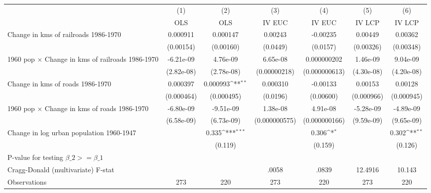 {
\def\sym#1{\ifmmode^{#1}\else\(^{#1}\)\fi}
\begin{tabular}{l*{6}{c}}
\hline\hline
                &\multicolumn{1}{c}{(1)}&\multicolumn{1}{c}{(2)}&\multicolumn{1}{c}{(3)}&\multicolumn{1}{c}{(4)}&\multicolumn{1}{c}{(5)}&\multicolumn{1}{c}{(6)}\\
                &\multicolumn{1}{c}{OLS}&\multicolumn{1}{c}{OLS}&\multicolumn{1}{c}{IV EUC}&\multicolumn{1}{c}{IV EUC}&\multicolumn{1}{c}{IV LCP}&\multicolumn{1}{c}{IV LCP}\\
\hline
Change in kms of railroads 1986-1970& 0.000911         & 0.000147         &  0.00243         & -0.00235         &  0.00449         &  0.00362         \\
                &(0.00154)         &(0.00160)         & (0.0449)         & (0.0157)         &(0.00326)         &(0.00348)         \\
[1em]
1960 pop $\times$ Change in kms of railroads 1986-1970&-6.21e-09         & 4.76e-09         & 6.65e-08         &0.000000202         & 1.46e-09         & 9.04e-09         \\
                &(2.82e-08)         &(2.78e-08)         &(0.00000218)         &(0.000000613)         &(4.30e-08)         &(4.20e-08)         \\
[1em]
Change in kms of roads 1986-1970& 0.000397         & 0.000993\sym{**} & 0.000310         & -0.00133         &  0.00153         &  0.00128         \\
                &(0.000464)         &(0.000495)         & (0.0196)         &(0.00600)         &(0.000966)         &(0.000945)         \\
[1em]
1960 pop $\times$ Change in kms of roads 1986-1970&-6.80e-09         &-9.51e-09         & 1.38e-08         & 4.91e-08         &-5.28e-09         &-4.89e-09         \\
                &(6.58e-09)         &(6.73e-09)         &(0.000000575)         &(0.000000166)         &(9.59e-09)         &(9.65e-09)         \\
[1em]
Change in log urban population 1960-1947&                  &    0.335\sym{***}&                  &    0.306\sym{*}  &                  &    0.302\sym{**} \\
                &                  &  (0.119)         &                  &  (0.159)         &                  &  (0.126)         \\
\hline
P-value for testing $\beta\_{2} >= \beta\_{1}$&                  &                  &                  &                  &                  &                  \\
Cragg-Donald (multivariate) F-stat&                  &                  &    .0058         &    .0839         &  12.4916         &   10.143         \\
Observations    &      273         &      220         &      273         &      220         &      273         &      220         \\
\hline\hline
\end{tabular}
}
